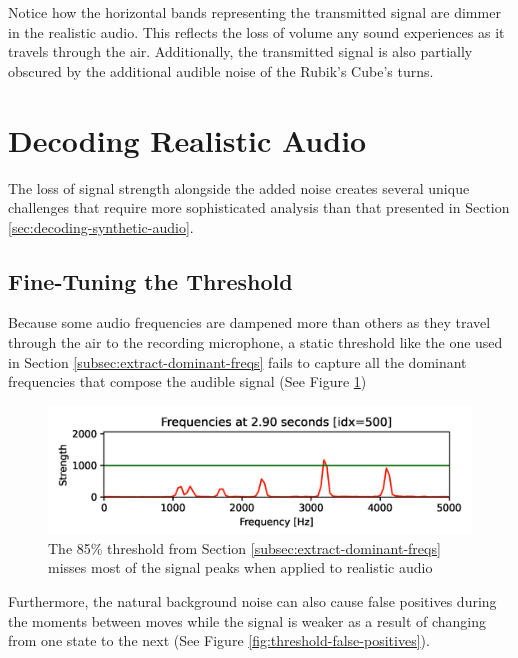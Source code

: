 Notice how the horizontal bands representing the transmitted signal are dimmer in the realistic audio.
This reflects the loss of volume any sound experiences as it travels through the air.
Additionally, the transmitted signal is also partially obscured by the additional audible noise of the Rubik's Cube's turns.

\section{Decoding Realistic Audio}
\label{sec:decoding-realistic-noise}
The loss of signal strength alongside the added noise creates several unique challenges that require more sophisticated analysis than that presented in Section \ref{sec:decoding-synthetic-audio}.

\subsection{Fine-Tuning the Threshold}
\label{subsec:fine-tuning-threshold}
Because some audio frequencies are dampened more than others as they travel through the air to the recording microphone, a static threshold like the one used in Section \ref{subsec:extract-dominant-freqs} fails to capture all the dominant frequencies that compose the audible signal (See Figure \ref{fig:threshold-miss})

\begin{figure}[h]
    \centering
    \includegraphics[width=0.8\linewidth]{Figures/5 Algorithm Design/threshold-miss.png}
    \caption{The 85\% threshold from Section \ref{subsec:extract-dominant-freqs} misses most of the signal peaks when applied to realistic audio}
    \label{fig:threshold-miss}
\end{figure}

Furthermore, the natural background noise can also cause false positives during the moments between moves while the signal is weaker as a result of changing from one state to the next (See Figure \ref{fig:threshold-false-positives}).

